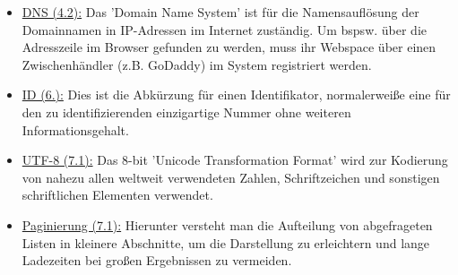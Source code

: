 \documentclass{article}
\begin{document}
\begin{itemize}
\item \underline{DNS (4.2):} Das 'Domain Name System' ist für die Namensauflösung der Domainnamen in IP-Adressen im Internet zuständig. Um bspsw. über die Adresszeile im Browser gefunden zu werden, muss ihr Webspace über einen Zwischenhändler (z.B. GoDaddy) im System registriert werden.
\item \underline{ID (6.):} Dies ist die Abkürzung für einen Identifikator, normalerweiße eine für den zu identifizierenden einzigartige Nummer ohne weiteren Informationsgehalt.
\item \underline{UTF-8 (7.1):} Das 8-bit 'Unicode Transformation Format' wird zur Kodierung von nahezu allen weltweit verwendeten Zahlen, Schriftzeichen und sonstigen schriftlichen Elementen verwendet.
\item \underline{Paginierung (7.1):} Hierunter versteht man die Aufteilung von abgefrageten Listen in kleinere Abschnitte, um die Darstellung zu erleichtern und lange Ladezeiten bei großen Ergebnissen zu vermeiden.
\end{itemize}
\end{document}
